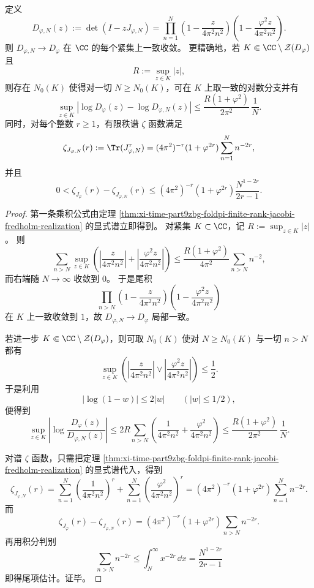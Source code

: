 \begin{theorem}\label{thm:xi-time-part9zbg-foldpi-finite-rank-fredholm-local-uniform}
定义
\[
D_{\varphi,N}(z)
:=
\det(I-zJ_{\varphi,N})
=
\prod_{n=1}^{N}
\left(1-\frac{z}{4\pi^2n^2}\right)
\left(1-\frac{\varphi^2 z}{4\pi^2n^2}\right).
\]
则 \(D_{\varphi,N}\to D_\varphi\) 在 \(\CC\) 的每个紧集上一致收敛。
更精确地，若 \(K\Subset \CC\setminus \mathcal Z(D_\varphi)\) 且
\[
R:=\sup_{z\in K}|z|,
\]
则存在 \(N_0(K)\) 使得对一切 \(N\ge N_0(K)\)，可在 \(K\) 上取一致的对数分支并有
\[
\sup_{z\in K}
\left|
\log D_\varphi(z)-\log D_{\varphi,N}(z)
\right|
\le
\frac{R(1+\varphi^2)}{2\pi^2}\,\frac{1}{N}.
\]
同时，对每个整数 \(r\ge 1\)，有限秩谱 \(\zeta\) 函数满足
\[
\zeta_{J_{\varphi,N}}(r):=\Tr(J_{\varphi,N}^r)
=
(4\pi^2)^{-r}(1+\varphi^{2r})\sum_{n=1}^{N}n^{-2r},
\]
并且
\[
0<
\zeta_{J_\varphi}(r)-\zeta_{J_{\varphi,N}}(r)
\le
(4\pi^2)^{-r}(1+\varphi^{2r})\frac{N^{1-2r}}{2r-1}.
\]
\end{theorem}
\begin{proof}
第一条乘积公式由定理 \ref{thm:xi-time-part9zbg-foldpi-finite-rank-jacobi-fredholm-realization} 的显式谱立即得到。
对紧集 \(K\subset\CC\)，记 \(R:=\sup_{z\in K}|z|\)。
则
\[
\sum_{n>N}\sup_{z\in K}
\left(
\left|\frac{z}{4\pi^2n^2}\right|
+
\left|\frac{\varphi^2 z}{4\pi^2n^2}\right|
\right)
\le
\frac{R(1+\varphi^2)}{4\pi^2}
\sum_{n>N}n^{-2},
\]
而右端随 \(N\to\infty\) 收敛到 \(0\)。
于是尾积
\[
\prod_{n>N}
\left(1-\frac{z}{4\pi^2n^2}\right)
\left(1-\frac{\varphi^2 z}{4\pi^2n^2}\right)
\]
在 \(K\) 上一致收敛到 \(1\)，故 \(D_{\varphi,N}\to D_\varphi\) 局部一致。

若进一步 \(K\Subset\CC\setminus \mathcal Z(D_\varphi)\)，则可取 \(N_0(K)\) 使对 \(N\ge N_0(K)\) 与一切 \(n>N\) 都有
\[
\sup_{z\in K}
\left(
\left|\frac{z}{4\pi^2n^2}\right|
\vee
\left|\frac{\varphi^2 z}{4\pi^2n^2}\right|
\right)
\le
\frac12.
\]
于是利用
\[
|\log(1-w)|\le 2|w|
\qquad (|w|\le 1/2),
\]
便得到
\[
\sup_{z\in K}
\left|
\log\frac{D_\varphi(z)}{D_{\varphi,N}(z)}
\right|
\le
2R\sum_{n>N}
\left(
\frac{1}{4\pi^2n^2}
+
\frac{\varphi^2}{4\pi^2n^2}
\right)
\le
\frac{R(1+\varphi^2)}{2\pi^2}\,\frac1N.
\]

对谱 \(\zeta\) 函数，只需把定理 \ref{thm:xi-time-part9zbg-foldpi-finite-rank-jacobi-fredholm-realization} 的显式谱代入，得到
\[
\zeta_{J_{\varphi,N}}(r)
=
\sum_{n=1}^{N}\left(\frac{1}{4\pi^2n^2}\right)^r
+
\sum_{n=1}^{N}\left(\frac{\varphi^2}{4\pi^2n^2}\right)^r
=
(4\pi^2)^{-r}(1+\varphi^{2r})\sum_{n=1}^{N}n^{-2r}.
\]
而
\[
\zeta_{J_\varphi}(r)-\zeta_{J_{\varphi,N}}(r)
=
(4\pi^2)^{-r}(1+\varphi^{2r})\sum_{n>N}n^{-2r}.
\]
再用积分判别
\[
\sum_{n>N}n^{-2r}
\le
\int_N^\infty x^{-2r}\,\dd x
=
\frac{N^{1-2r}}{2r-1}
\]
即得尾项估计。证毕。
\end{proof}

